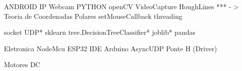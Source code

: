 ANDROID 
    IP Webcam
PYTHON
    openCV
        VideoCapture
        HoughLines *** - > Teoria de Coordenadas Polares
        setMouseCallback
    threading

    socket
        UDP*
    sklearn
        tree.DecisionTreeClassifier* 
        joblib*
        pandas
        
Eletronica 
    NodeMcu
        ESP32
            IDE Arduino
            AsyncUDP
    Ponte H (Driver)

    Motores DC 
